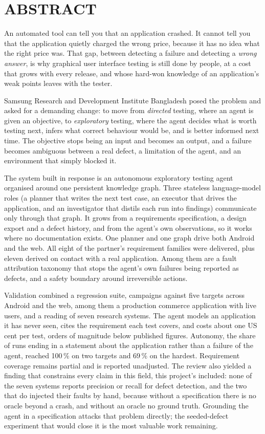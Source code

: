 \chapter*{ABSTRACT}

An automated tool can tell you that an application crashed. It cannot tell you
that the application quietly charged the wrong price, because it has no idea
what the right price was. That gap, between detecting a failure and detecting a
\emph{wrong answer}, is why graphical user interface testing is still done by
people, at a cost that grows with every release, and whose hard-won knowledge of an
application's weak points leaves with the tester.

Samsung Research and Development Institute Bangladesh posed the problem and
asked for a demanding change: to move from \emph{directed} testing, where an
agent is given an objective, to \emph{exploratory} testing, where the agent
decides what is worth testing next, infers what correct behaviour would be, and
is better informed next time. The objective stops being an input
and becomes an output, and a failure becomes ambiguous between a real defect, a
limitation of the agent, and an environment that simply blocked it.

The system built in response is an autonomous exploratory testing agent
organised around one persistent knowledge graph. Three stateless
language-model roles (a planner that writes the next test case, an executor that
drives the application, and an investigator that distils each run into
findings) communicate only through that graph. It grows from a requirements
specification, a design export and a defect history, and from the agent's own
observations, so it works where no documentation exists. One planner and one
graph drive both Android and the web. All eight of the partner's requirement
families were delivered, plus eleven derived on contact with a real
application. Among them are a fault attribution taxonomy that stops the
agent's own failures being reported as defects, and a safety boundary
around irreversible actions.

Validation combined a regression suite, campaigns against five targets across
Android and the web, among them a production commerce application with live
users, and a reading of seven research systems. The agent models an
application it has never seen, cites the requirement each test covers, and
costs about one US cent per test, orders of magnitude below published figures.
Autonomy, the share of runs ending in a statement about the application rather
than a failure of the agent, reached 100\,\% on two targets and 69\,\% on the
hardest. Requirement coverage remains partial and is reported unadjusted. The review also yielded a finding
that constrains every claim in this field, this project's included: none of the
seven systems reports precision or recall for defect detection, and the two that
do injected their faults by hand, because without a specification there is no
oracle beyond a crash, and without an oracle no ground truth. Grounding the
agent in a specification attacks that problem directly; the seeded-defect
experiment that would close it is the most valuable work remaining.

